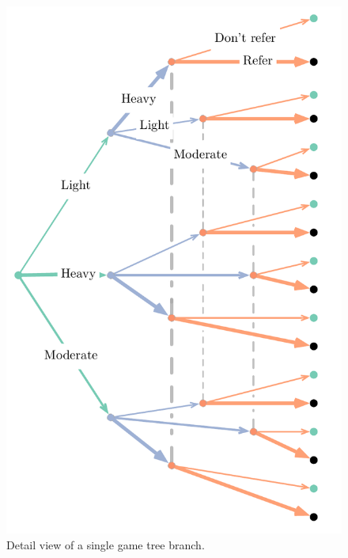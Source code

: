 \begin{figure}[H]
\begin{adjustbox}{center}
\includegraphics[width=0.43\paperwidth]{figures/tree_zoom}
\end{adjustbox}
\caption{Detail view of a single game tree branch.}

\label{fig:zoom_tree}
\end{figure}

